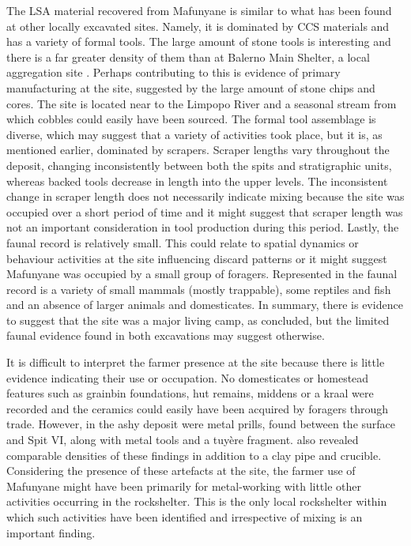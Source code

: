 The LSA material recovered from Mafunyane is similar to what has been found at other locally excavated sites. Namely, it is dominated by CCS materials and has a variety of formal tools. The large amount of stone tools is interesting and there is a far greater density of them than at Balerno Main Shelter, 
a local aggregation site \parencite{vanDoornum_2008}. Perhaps contributing to this is evidence of primary manufacturing at the site, suggested by the large amount of stone chips and cores. The site is located near to the Limpopo River and a seasonal stream from which cobbles could easily have been sourced. The formal tool assemblage is diverse, 
which may suggest that a variety of activities took place, but it is, as mentioned earlier, dominated by scrapers. Scraper lengths vary throughout the deposit, changing inconsistently between both the spits and stratigraphic units, whereas backed tools decrease in length into the upper levels. The inconsistent change in scraper length does not necessarily indicate mixing because the site was occupied over a short period of time and it might suggest that scraper length was not an important consideration in tool production during this period. Lastly, 
the faunal record is relatively small. This could relate to spatial dynamics or behaviour activities at the site influencing discard patterns or it might suggest Mafunyane was occupied by a small group of foragers. Represented in the faunal record is a variety of small mammals (mostly trappable), some reptiles and fish and an absence of larger animals and domesticates. In summary, there is evidence to suggest that the site was a major living camp, as \textcite{Walker_1994} concluded, but the limited faunal evidence found in both excavations may suggest otherwise.

It is difficult to interpret the farmer presence at the site because there is little evidence indicating their use or occupation. No domesticates or homestead features such as grainbin foundations, hut remains, middens or a kraal were recorded and the ceramics could easily have been acquired by foragers through trade. However, in the ashy deposit were metal prills, found between the surface and Spit VI, along with metal tools and a tuyère fragment. \textcite{Walker_1994} also revealed comparable densities of these findings in addition to a clay pipe and crucible. Considering the presence of these artefacts at the site, the farmer use of Mafunyane might have been primarily for metal-working with little other activities occurring in the rockshelter. This is the only local rockshelter within which such activities have been identified and irrespective of mixing is an important finding.

